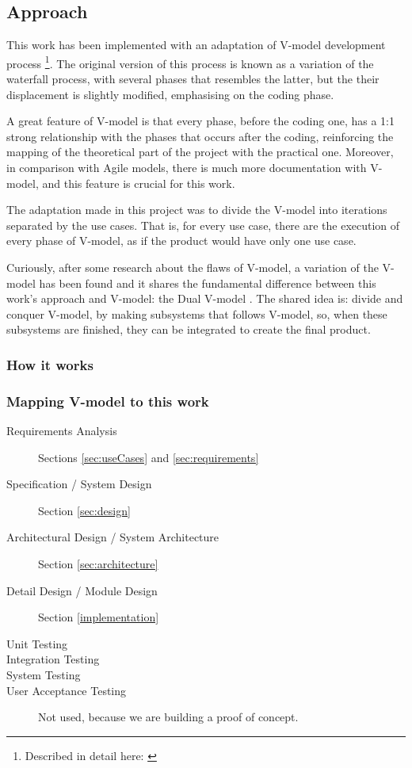 \subsection{Approach}
This work has been implemented with an adaptation of V-model development process
\footnote{Described in detail here: \cite{mathur2010advancements}}.
The original version of this process is known as a variation of the waterfall process,
with several phases that resembles the latter,
but the their displacement is slightly modified,
emphasising on the coding phase.

A great feature of V-model is that every phase,
before the coding one,
has a 1:1 strong relationship with the phases that occurs after the coding,
reinforcing the mapping of the theoretical part of the project with the practical one.
Moreover,
in comparison with Agile models,
there is much more documentation with V-model,
and this feature is crucial for this work.

The adaptation made in this project was to divide the V-model into iterations separated by the use cases.
That is,
for every use case,
there are the execution of every phase of V-model,
as if the product would have only one use case.

Curiously,
after some research about the flaws of V-model,
a variation of the V-model has been found and it shares the fundamental difference between this work's approach and V-model:
the Dual V-model \cite{clark2009system}.
The shared idea is: divide and conquer V-model, 
by making subsystems that follows V-model,
so,
when these subsystems are finished,
they can be integrated to create the final product.

\subsubsection{How it works}

\subsubsection{Mapping V-model to this work}
\begin{description}
    \item[Requirements Analysis] Sections \ref{sec:useCases} and \ref{sec:requirements}
    \item[Specification / System Design] Section \ref{sec:design}
    \item[Architectural Design / System Architecture] Section  \ref{sec:architecture}
    \item[Detail Design / Module Design] Section \ref{implementation}
    \item[Unit Testing] 
    \item[Integration Testing] 
    \item[System Testing] 
    \item[User Acceptance Testing] Not used, because we are building a proof of concept.
\end{description}


